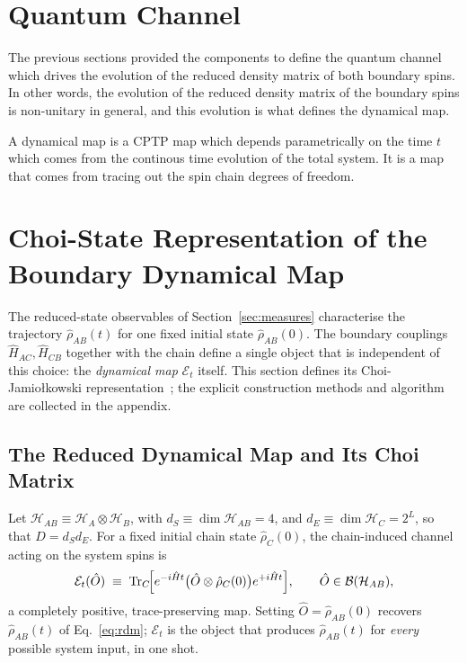 \documentclass[12pt,a4paper]{article}
\newcommand{\Ham}{\hat{H}}
\newcommand{\rhohat}{\hat{\rho}}
\newcommand{\Hilb}{\mathcal{H}}
\newcommand{\TrC}{\mathrm{Tr}_C}
\begin{document}
\clearpage
\newpage
\section{Quantum Channel}
\label{sec:quantum_channel}

The previous sections provided the components to define the quantum channel which drives the evolution of the reduced density matrix of both boundary spins. In other words, the evolution of the reduced density matrix of the boundary spins is non-unitary in general, and this evolution is what defines the dynamical map.

A dynamical map is a CPTP map which depends parametrically on the time $t$ which comes from the continous time evolution of the total system. It is a map that comes from tracing out the spin chain degrees of freedom.

\section{Choi-State Representation of the Boundary Dynamical Map}
\label{sec:choi}

The reduced-state observables of Section~\ref{sec:measures} characterise the
trajectory $\rhohat_{AB}(t)$ for one fixed initial state $\rhohat_{AB}(0)$.
The boundary couplings $\Ham_{AC},\Ham_{CB}$ together with the chain define a
single object that is independent of this choice: the \emph{dynamical map}
$\mathcal{E}_t$ itself. This section defines its Choi-Jamio{\l}kowski
representation~\cite{NielsenChuang2000}; the explicit construction methods and algorithm are collected in the appendix.

\subsection{The Reduced Dynamical Map and Its Choi Matrix}
\label{subsec:choi_def}

Let $\Hilb_{AB}\equiv\Hilb_A\otimes\Hilb_B$, with $d_S\equiv\dim\Hilb_{AB}=4$,
and $d_E\equiv\dim\Hilb_C=2^L$, so that $D=d_Sd_E$. For a fixed initial chain
state $\rhohat_C(0)$, the chain-induced channel acting on the system spins is
\begin{equation}
  \mathcal{E}_t(\hat{O}) \;\equiv\;
  \TrC\!\Bigl[e^{-i\Ham t}\bigl(\hat{O}\otimes\rhohat_C(0)\bigr)e^{+i\Ham t}\Bigr],
  \qquad \hat{O}\in\mathcal{B}(\Hilb_{AB}),
  \label{eq:choi_channel}
\end{equation}
a completely positive, trace-preserving map. Setting $\hat O=\rhohat_{AB}(0)$
recovers $\rhohat_{AB}(t)$ of Eq.~\eqref{eq:rdm}; $\mathcal{E}_t$ is the
object that produces $\rhohat_{AB}(t)$ for \emph{every} possible system
input, in one shot.
\end{document}

